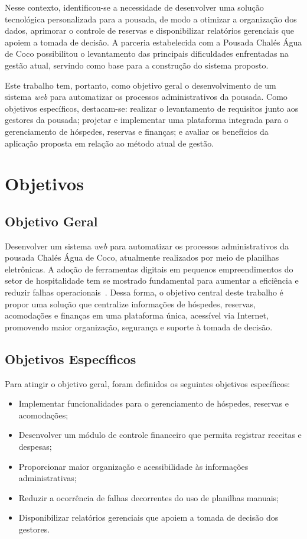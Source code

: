 \documentclass[
	12pt,				%
	openany,			%
	oneside,			%
	a4paper,			%
	english,			%
	french,				%
	spanish,			%
	brazil				%
	]{abntex2}
\begin{document}
Nesse contexto, identificou-se a necessidade de desenvolver uma solução tecnológica personalizada para a pousada, de modo a otimizar a organização dos dados, aprimorar o controle de reservas e disponibilizar relatórios gerenciais que apoiem a tomada de decisão. A parceria estabelecida com a Pousada Chalés Água de Coco possibilitou o levantamento das principais dificuldades enfrentadas na gestão atual, servindo como base para a construção do sistema proposto.

Este trabalho tem, portanto, como objetivo geral o desenvolvimento de um sistema \textit{web} para automatizar os processos administrativos da pousada. Como objetivos específicos, destacam-se: realizar o levantamento de requisitos junto aos gestores da pousada; projetar e implementar uma plataforma integrada para o gerenciamento de hóspedes, reservas e finanças; e avaliar os benefícios da aplicação proposta em relação ao método atual de gestão.

\section{Objetivos}

\subsection{Objetivo Geral}
Desenvolver um sistema \textit{web} para automatizar os processos administrativos da pousada Chalés Água de Coco, atualmente realizados por meio de planilhas eletrônicas. A adoção de ferramentas digitais em pequenos empreendimentos do setor de hospitalidade tem se mostrado fundamental para aumentar a eficiência e reduzir falhas operacionais~\cite{totvs}. Dessa forma, o objetivo central deste trabalho é propor uma solução que centralize informações de hóspedes, reservas, acomodações e finanças em uma plataforma única, acessível via Internet, promovendo maior organização, segurança e suporte à tomada de decisão.

\subsection{Objetivos Específicos}
Para atingir o objetivo geral, foram definidos os seguintes objetivos específicos:
\begin{itemize}
	\item Implementar funcionalidades para o gerenciamento de hóspedes, reservas e acomodações;
	\item Desenvolver um módulo de controle financeiro que permita registrar receitas e despesas;
	\item Proporcionar maior organização e acessibilidade às informações administrativas;
	\item Reduzir a ocorrência de falhas decorrentes do uso de planilhas manuais;
	\item Disponibilizar relatórios gerenciais que apoiem a tomada de decisão dos gestores.
\end{itemize}
\end{document}
